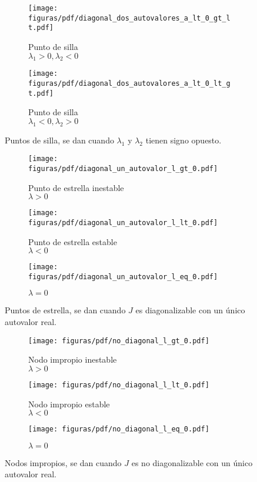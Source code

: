 \documentclass[../ecuaciones_diferenciales.tex]{subfiles}
\begin{document}
\begin{figure}[ht]
  \centering
  \begin{subfigure}{0.25\textwidth}
    \centering
    \texttt{[image: figuras/pdf/diagonal\_dos\_autovalores\_a\_lt\_0\_gt\_lt.pdf]}
    \caption*{Punto de silla \\ \(\lambda_1 > 0, \lambda_2 < 0\)}
  \end{subfigure}%
  \begin{subfigure}{0.25\textwidth}
    \centering
    \texttt{[image: figuras/pdf/diagonal\_dos\_autovalores\_a\_lt\_0\_lt\_gt.pdf]}
    \caption*{Punto de silla \\ \(\lambda_1 < 0, \lambda_2 > 0\)}
  \end{subfigure}
  \caption{Puntos de silla, se dan cuando \(\lambda_1\) y \(\lambda_2\) tienen signo opuesto.}
\end{figure}

\begin{figure}[ht]
  \centering
  \begin{subfigure}{0.33\textwidth}
    \centering
    \texttt{[image: figuras/pdf/diagonal\_un\_autovalor\_l\_gt\_0.pdf]}
    \caption*{Punto de estrella inestable \\ \(\lambda > 0\)}
  \end{subfigure}%
  \begin{subfigure}{0.33\textwidth}
    \centering
    \texttt{[image: figuras/pdf/diagonal\_un\_autovalor\_l\_lt\_0.pdf]}
    \caption*{Punto de estrella estable \\ \(\lambda < 0\)}
  \end{subfigure}%
  \begin{subfigure}{0.33\textwidth}
    \centering
    \texttt{[image: figuras/pdf/diagonal\_un\_autovalor\_l\_eq\_0.pdf]}
    \caption*{\(\lambda = 0\)}
  \end{subfigure}
  \caption{Puntos de estrella, se dan cuando \(J\) es diagonalizable con un único autovalor real.}
\end{figure}

\begin{figure}[ht]
  \centering
  \begin{subfigure}{0.33\textwidth}
    \centering
    \texttt{[image: figuras/pdf/no\_diagonal\_l\_gt\_0.pdf]}
    \caption*{Nodo impropio inestable \\ \(\lambda > 0\)}
  \end{subfigure}%
  \begin{subfigure}{0.33\textwidth}
    \centering
    \texttt{[image: figuras/pdf/no\_diagonal\_l\_lt\_0.pdf]}
    \caption*{Nodo impropio estable \\ \(\lambda < 0\)}
  \end{subfigure}%
  \begin{subfigure}{0.33\textwidth}
    \centering
    \texttt{[image: figuras/pdf/no\_diagonal\_l\_eq\_0.pdf]}
    \caption*{\(\lambda = 0\)}
  \end{subfigure}
  \caption{Nodos impropios, se dan cuando \(J\) es no diagonalizable con un único autovalor real.}
\end{figure}
\end{document}
